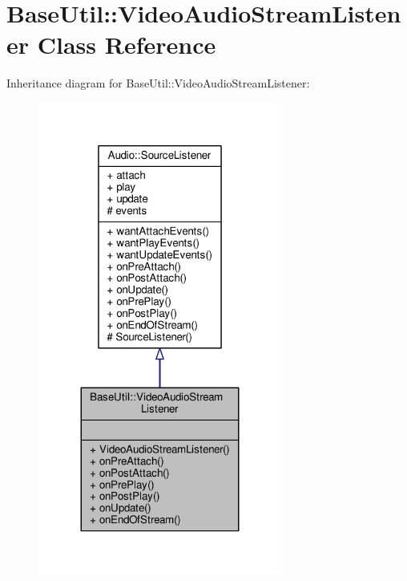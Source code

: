 \hypertarget{classBaseUtil_1_1VideoAudioStreamListener}{}\section{Base\+Util\+:\+:Video\+Audio\+Stream\+Listener Class Reference}
\label{classBaseUtil_1_1VideoAudioStreamListener}


Inheritance diagram for Base\+Util\+:\+:Video\+Audio\+Stream\+Listener\+:
\nopagebreak
\begin{figure}[H]
\begin{center}
\leavevmode
\includegraphics[width=227pt]{df/dc3/classBaseUtil_1_1VideoAudioStreamListener__inherit__graph}
\end{center}
\end{figure}


